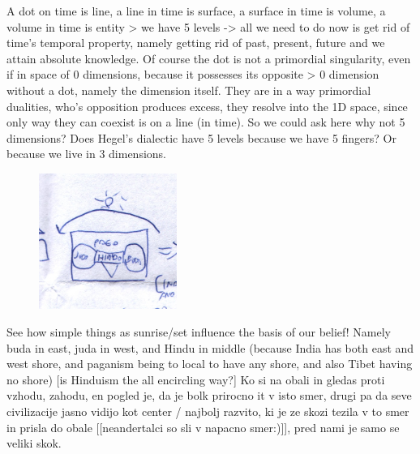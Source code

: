 \documentclass[10pt]{book}
\begin{document}
A dot on time is line, a line in time is surface, a surface in time is volume, a volume in time is entity > we have 5 levels -> all we need to do now is get rid of time's temporal property, namely getting rid of past, present, future and we attain absolute knowledge.
Of course the dot is not a primordial singularity, even if in space of 0 dimensions, because it possesses its opposite > 0 dimension without a dot, namely the dimension itself. They are in a way primordial dualities, who's opposition produces excess, they resolve into the 1D space, since only way they can coexist is on a line (in time).
So we could ask here why not 5 dimensions? Does Hegel's dialectic have 5 levels because we have 5 fingers? Or because we live in 3 dimensions.
\begin{figure}[ht!]
\centering
\includegraphics[width=45mm]{scan01.jpg}
\label{overflow}
\end{figure}
See how simple things as sunrise/set influence the basis of our belief! Namely buda in east, juda in west, and Hindu in middle (because India has both east and west shore, and paganism being to local to have any shore, and also Tibet having no shore) [is Hinduism the all encircling way?] Ko si na obali in gledas proti vzhodu, zahodu, en pogled je, da je bolk prirocno it v isto smer, drugi pa da seve civilizacije jasno vidijo kot center / najbolj razvito, ki je ze skozi tezila v to smer in prisla do obale [[neandertalci so sli v napacno smer:)]], pred nami je samo se veliki skok.
\end{document}
